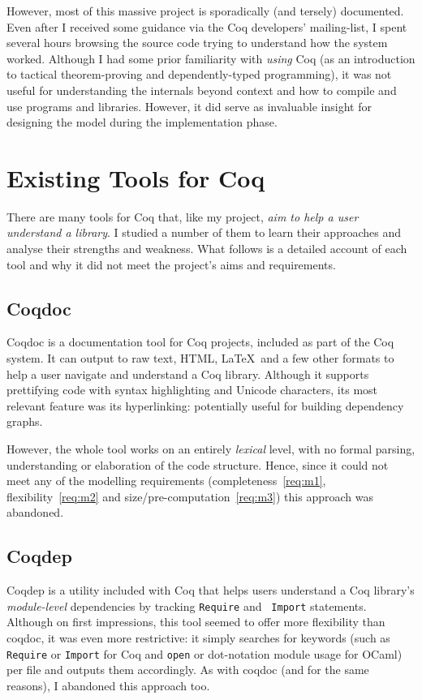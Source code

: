 However, most of this massive project is sporadically (and tersely) documented.
Even after I received some guidance via the Coq developers' mailing-list, I
spent several hours browsing the source code trying to understand how the system
worked. Although I had some prior familiarity with \emph{using} Coq (as an
introduction to tactical theorem-proving and dependently-typed programming), it
was not useful for understanding the internals beyond context and how to compile
and use programs and libraries. However, it did serve as invaluable insight for
designing the model during the implementation phase.

\section{Existing Tools for Coq}\label{prep:coqtools}

There are many tools for Coq that, like my project, \emph{aim to help a user
understand a library}. I studied a number of them to learn their approaches and
analyse their strengths and weakness. What follows is a detailed account of
each tool and why it did not meet the project's aims and requirements.

\subsection{Coqdoc}

Coqdoc is a documentation tool for Coq projects, included as part of the Coq
system. It can output to raw text, HTML, \LaTeX~and a few other formats to help
a user navigate and understand a Coq library.  Although it supports prettifying
code with syntax highlighting and Unicode characters, its most relevant feature
was its hyperlinking: potentially useful for building dependency graphs.

However, the whole tool works on an entirely \emph{lexical} level, with no
formal parsing, understanding or elaboration of the code structure. Hence, since
it could not meet any of the modelling requirements (completeness~\ref{req:m1},
flexibility~\ref{req:m2} and size/pre-computation~\ref{req:m3}) this approach was
abandoned.

\subsection{Coqdep}

Coqdep is a utility included with Coq that helps users understand a Coq
library's \emph{module-level} dependencies by tracking {\tt Require} and {\tt
Import} statements.  Although on first impressions, this tool seemed to offer
more flexibility than coqdoc, it was even more restrictive: it simply searches
for keywords (such as \texttt{Require} or \texttt{Import} for Coq  and
\texttt{open} or dot-notation module usage for OCaml) per file and outputs them
accordingly. As with coqdoc (and for the same reasons), I abandoned this
approach too.

